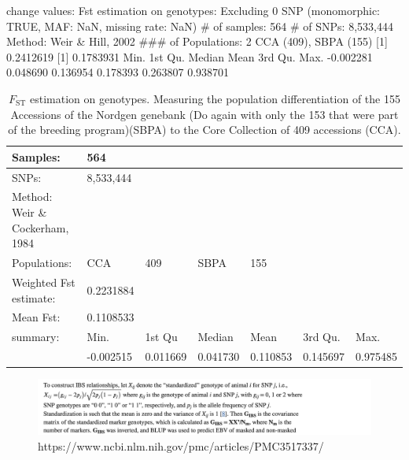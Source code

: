 \documentclass[9pt, onecolumn,twoside]{gsajnl}
\begin{document}
change values:
Fst estimation on genotypes:
Excluding 0 SNP (monomorphic: TRUE, MAF: NaN, missing rate: NaN)
    # of samples: 564
    # of SNPs: 8,533,444
Method: Weir & Hill, 2002
### of Populations: 2
    CCA (409), SBPA (155)
[1] 0.2412619
[1] 0.1783931
     Min.   1st Qu.    Median      Mean   3rd Qu.      Max. 
-0.002281  0.048690  0.136954  0.178393  0.263807  0.938701 
\begin{table}[p]
\centering 
\caption{$F_{\text{ST}}$ estimation on genotypes. Measuring the population differentiation of  the 155 Accessions of the Nordgen genebank (Do again with only the 153 that were part of the breeding program)(SBPA) to the Core Collection of 409 accessions (CCA).}

\begin{tableminipage}{\textwidth}
\begin{tabular}{|l|l|l|l|l|l|l|}
\hline

Samples:                        &564        &          &          &          &          &          \\ \hline
SNPs:                           & 8,533,444 &          &          &          &          &          \\ \hline
Method: Weir \& Cockerham, 1984 &           &          &          &          &          &          \\ \hline
Populations:                  & CCA       & 409      & SBPA     & 155      &          &          \\ \hline
Weighted Fst estimate:          &0.2231884  &          &          &          &          &          \\ \hline
Mean Fst:                       &0.1108533  &          &          &          &          &          \\ \hline
summary:                        & Min.      & 1st Qu   & Median   & Mean     & 3rd Qu.  & Max.     \\ \hline
                                & -0.002515 & 0.011669 & 0.041730 & 0.110853 & 0.145697 & 0.975485 \\ \hline
\end{tabular}
  \label{tab:fst}
\end{tableminipage}
\end{table}


\begin{figure}
    \centering
    \includegraphics[width=0.5\linewidth]{Screenshot 2023-07-02 at 14.40.39.png}
    \caption{https://www.ncbi.nlm.nih.gov/pmc/articles/PMC3517337/}
    \label{fig:enter-label}
\end{figure}
\end{document}
